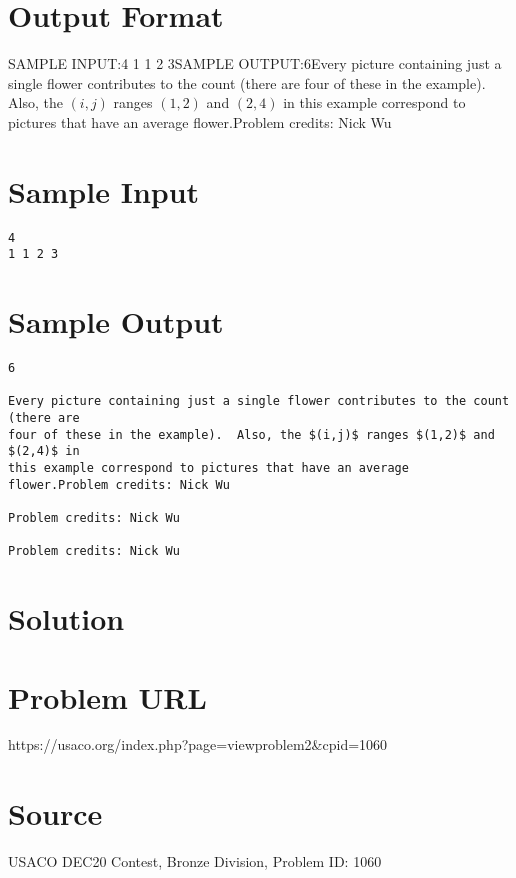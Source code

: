 \documentclass[12pt]{article}
\begin{document}
\section*{Output Format}
SAMPLE INPUT:4
1 1 2 3SAMPLE OUTPUT:6Every picture containing just a single flower contributes to the count (there are
four of these in the example).  Also, the $(i,j)$ ranges $(1,2)$ and $(2,4)$ in
this example correspond to pictures that have an average flower.Problem credits: Nick Wu

\section*{Sample Input}
\begin{verbatim}
4
1 1 2 3
\end{verbatim}

\section*{Sample Output}
\begin{verbatim}
6

Every picture containing just a single flower contributes to the count (there are
four of these in the example).  Also, the $(i,j)$ ranges $(1,2)$ and $(2,4)$ in
this example correspond to pictures that have an average flower.Problem credits: Nick Wu

Problem credits: Nick Wu

Problem credits: Nick Wu
\end{verbatim}

\section*{Solution}


\section*{Problem URL}
https://usaco.org/index.php?page=viewproblem2&cpid=1060

\section*{Source}
USACO DEC20 Contest, Bronze Division, Problem ID: 1060
\end{document}
